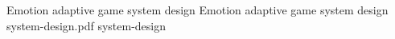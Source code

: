 \img
{Emotion adaptive game system design}
{Emotion adaptive game system design}
{system-design.pdf}
{system-design}


